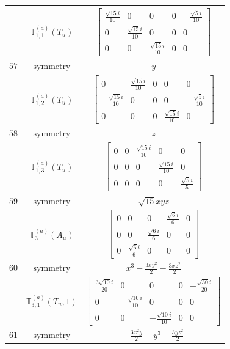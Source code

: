 \documentclass[fleqn,8pt,landscape]{jsarticle}
\begin{document}
\begin{longtable}{ccc}
$  $ & $ \mathbb{T}_{1,1}^{(a)}(T_{u}) $ & $ \begin{bmatrix} \frac{\sqrt{15} i}{10} & 0 & 0 & 0 & - \frac{\sqrt{5} i}{10} \\ 0 & \frac{\sqrt{15} i}{10} & 0 & 0 & 0 \\ 0 & 0 & \frac{\sqrt{15} i}{10} & 0 & 0 \end{bmatrix} $ \\ \hline
$ 57 $ & $ \text{symmetry} $ & $ y $ \\
$  $ & $ \mathbb{T}_{1,2}^{(a)}(T_{u}) $ & $ \begin{bmatrix} 0 & \frac{\sqrt{15} i}{10} & 0 & 0 & 0 \\ - \frac{\sqrt{15} i}{10} & 0 & 0 & 0 & - \frac{\sqrt{5} i}{10} \\ 0 & 0 & 0 & \frac{\sqrt{15} i}{10} & 0 \end{bmatrix} $ \\ \hline
$ 58 $ & $ \text{symmetry} $ & $ z $ \\
$  $ & $ \mathbb{T}_{1,3}^{(a)}(T_{u}) $ & $ \begin{bmatrix} 0 & 0 & \frac{\sqrt{15} i}{10} & 0 & 0 \\ 0 & 0 & 0 & \frac{\sqrt{15} i}{10} & 0 \\ 0 & 0 & 0 & 0 & \frac{\sqrt{5} i}{5} \end{bmatrix} $ \\ \hline
$ 59 $ & $ \text{symmetry} $ & $ \sqrt{15} x y z $ \\
$  $ & $ \mathbb{T}_{3}^{(a)}(A_{u}) $ & $ \begin{bmatrix} 0 & 0 & 0 & \frac{\sqrt{6} i}{6} & 0 \\ 0 & 0 & \frac{\sqrt{6} i}{6} & 0 & 0 \\ 0 & \frac{\sqrt{6} i}{6} & 0 & 0 & 0 \end{bmatrix} $ \\ \hline
$ 60 $ & $ \text{symmetry} $ & $ x^{3} - \frac{3 x y^{2}}{2} - \frac{3 x z^{2}}{2} $ \\
$  $ & $ \mathbb{T}_{3,1}^{(a)}(T_{u},1) $ & $ \begin{bmatrix} \frac{3 \sqrt{10} i}{20} & 0 & 0 & 0 & - \frac{\sqrt{30} i}{20} \\ 0 & - \frac{\sqrt{10} i}{10} & 0 & 0 & 0 \\ 0 & 0 & - \frac{\sqrt{10} i}{10} & 0 & 0 \end{bmatrix} $ \\ \hline
$ 61 $ & $ \text{symmetry} $ & $ - \frac{3 x^{2} y}{2} + y^{3} - \frac{3 y z^{2}}{2} $ \\

\end{longtable}
\end{document}
